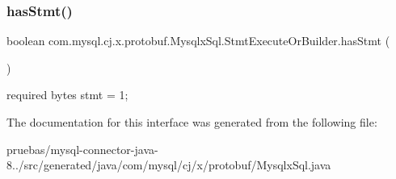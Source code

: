 \subsubsection{\texorpdfstring{has\+Stmt()}{hasStmt()}}
{\footnotesize\ttfamily boolean com.\+mysql.\+cj.\+x.\+protobuf.\+Mysqlx\+Sql.\+Stmt\+Execute\+Or\+Builder.\+has\+Stmt (\begin{DoxyParamCaption}{ }\end{DoxyParamCaption})}

{\ttfamily required bytes stmt = 1;} 

The documentation for this interface was generated from the following file\+:\begin{DoxyCompactItemize}
\item 
pruebas/mysql-\/connector-\/java-\/8../src/generated/java/com/mysql/cj/x/protobuf/Mysqlx\+Sql.\+java\end{DoxyCompactItemize}

